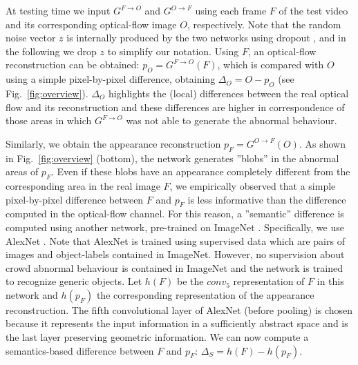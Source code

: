 \documentclass{article}
\begin{document}
	At testing time we input $G^{F \rightarrow O}$ and $G^{O \rightarrow F}$ using each frame $F$ of the test video and its corresponding optical-flow image $O$, respectively.
	Note that the random noise vector $z$ is internally produced by the two networks using dropout \cite{DBLP:journals/corr/IsolaZZE16}, and 
	in the following 
	we drop $z$ to simplify our notation.
	Using $F$, an optical-flow reconstruction can be obtained: $p_O= G^{F \rightarrow O}(F)$, which is compared with $O$ using a simple pixel-by-pixel difference, obtaining $\Delta_O = O - p_O$ (see Fig.~\ref{fig:overview}). $\Delta_O$ highlights the (local) differences between the real optical flow and its reconstruction and these differences are higher in correspondence of those areas in which $G^{F \rightarrow O}$ was not able to generate the abnormal behaviour. 
	
	Similarly, we obtain the appearance reconstruction $p_F = G^{O \rightarrow F}(O)$.
	As shown in Fig.~\ref{fig:overview} (bottom), the network generates ''blobs'' in the abnormal areas of 
	$p_F$. Even if these blobs have an appearance completely different from the corresponding area in the real image $F$,
	we empirically observed that a simple pixel-by-pixel difference between $F$ and $p_F$ is less informative than the difference computed in the optical-flow channel. For this reason, a ''semantic'' difference is computed using another network, pre-trained on ImageNet \cite{russakovsky2015imagenet}.
	Specifically, we use AlexNet \cite{alexnet}. Note that AlexNet is trained using supervised data which are pairs of images and object-labels contained in ImageNet. However, no supervision about crowd abnormal behaviour is contained in ImageNet and the network is trained to recognize generic objects.
	Let $h(F)$ be the $conv_5$ representation of $F$ in this network and $h(p_F)$ the corresponding representation of the appearance reconstruction. The fifth convolutional layer of AlexNet (before pooling) is chosen because it represents the input information in a sufficiently abstract space and is the last layer preserving geometric information. We can now compute a semantics-based difference between $F$ and $p_F$: $\Delta_S = h(F) - h(p_F)$.
	
\end{document}
